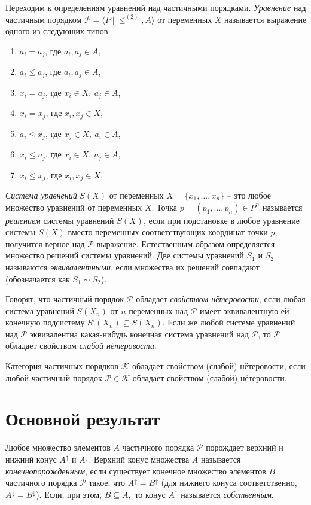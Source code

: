 \documentclass[12pt]{article}
\theoremstyle{break}
\def\P{\mathcal{P}}
\begin{document}
		Переходим к определениям уравнений над частичными порядками. \textit{Уравнение} над частичным порядком $\P = \langle P~|~\leqslant^{(2)}, A\rangle$ от переменных $X$ называется выражение одного из следующих типов:
		\begin{enumerate}
			\item $a_i=a_j$, где $a_i, a_j\in A$,
			\item $a_i\leqslant a_j$, где $a_i, a_j\in A$,
			\item $x_i=a_j$, где $x_i\in X,~a_j\in A$,
			\item $x_i=x_j$, где $x_i, x_j\in X$,
			\item $a_i\leqslant x_j$, где $x_j\in X,~a_i\in A$,
			\item $x_i\leqslant a_j$, где $x_i\in X,~a_j\in A$,
			\item $x_i\leqslant x_j$, где $x_i, x_j\in X$.
		\end{enumerate}

		\textit{Система уравнений} $S(X)$ от переменных $X=\{x_1,\dots,x_n\}$ -- это любое множество уравнений от переменных $X$. Точка $p=(p_1,\dots,p_n)\in P^n$ называется \textit{решением} системы уравнений $S(X)$, если при подстановке в любое уравнение системы $S(X)$ вместо переменных соответствующих координат точки $p$, получится верное над $\P$ выражение. Естественным образом определяется множество решений системы уравнений. Две системы уравнений $S_1$ и $S_2$ называются \textit{эквивалентными}, если множества их решений совпадают (обозначается как $S_1\sim S_2$).
		
		
		Говорят, что частичный порядок $\P$ обладает \textit{свойством нётеровости}, если любая система уравнений $S(X_n)$ от $n$ переменных над $\P$ имеет эквивалентную ей конечную подсистему $S'(X_n) \subseteq S(X_n)$. Если же любой системе уравнений над $\P$ эквивалентна какая-нибудь конечная система уравнений над $\P$, то $\P$ обладает свойством \textit{слабой нётеровости}.
		
		Категория частичных порядков $\mathcal{K}$ обладает свойством (слабой) нётеровости, если любой частичный порядок $\P \in \mathcal{K}$ обладает свойством (слабой) нётеровости.
		
	
	\section{Основной результат}
		Любое множество элементов $A$ частичного порядка $\P$ порождает верхний и нижний конус $A^{\uparrow}$ и $A^{\downarrow}$. Верхний конус множества $A$ называется \textit{конечнопорожденным}, если существует конечное множество элементов $B$ частичного порядка $\P$ такое, что $A^{\uparrow} = B^{\uparrow}$ (для нижнего конуса соответственно, $A^{\downarrow} = B^{\downarrow}$). Если, при этом, $B\subseteq A,$ то конус $A^{\uparrow}$ называется \textit{собственным}.
\end{document}
